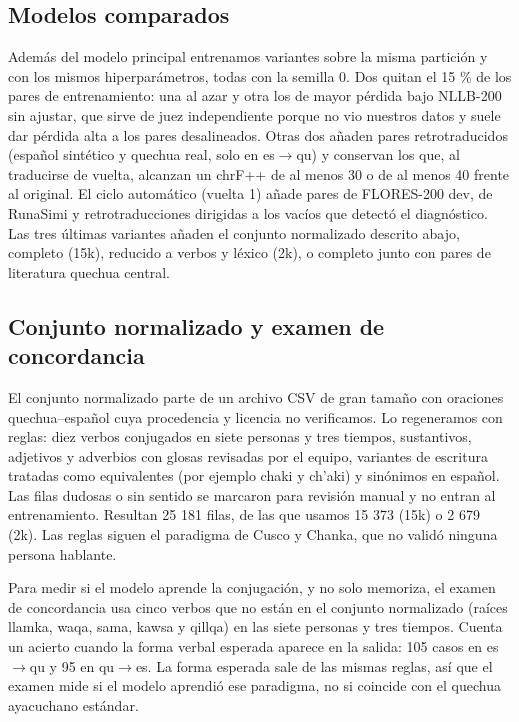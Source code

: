 \documentclass[conference]{IEEEtran}
\begin{document}
\subsection{Modelos comparados}
Además del modelo principal entrenamos variantes sobre la misma partición y con los mismos hiperparámetros, todas con la semilla 0. Dos quitan el 15 \% de los pares de entrenamiento: una al azar y otra los de mayor pérdida bajo NLLB-200 sin ajustar, que sirve de juez independiente porque no vio nuestros datos y suele dar pérdida alta a los pares desalineados. Otras dos añaden pares retrotraducidos (español sintético y quechua real, solo en es$\rightarrow$qu) y conservan los que, al traducirse de vuelta, alcanzan un chrF++ de al menos 30 o de al menos 40 frente al original. El ciclo automático (vuelta 1) añade pares de FLORES-200 dev, de RunaSimi y retrotraducciones dirigidas a los vacíos que detectó el diagnóstico. Las tres últimas variantes añaden el conjunto normalizado descrito abajo, completo (15k), reducido a verbos y léxico (2k), o completo junto con pares de literatura quechua central.

\subsection{Conjunto normalizado y examen de concordancia}
El conjunto normalizado parte de un archivo CSV de gran tamaño con oraciones quechua–español cuya procedencia y licencia no verificamos. Lo regeneramos con reglas: diez verbos conjugados en siete personas y tres tiempos, sustantivos, adjetivos y adverbios con glosas revisadas por el equipo, variantes de escritura tratadas como equivalentes (por ejemplo chaki y ch'aki) y sinónimos en español. Las filas dudosas o sin sentido se marcaron para revisión manual y no entran al entrenamiento. Resultan 25 181 filas, de las que usamos 15 373 (15k) o 2 679 (2k). Las reglas siguen el paradigma de Cusco y Chanka, que no validó ninguna persona hablante.

Para medir si el modelo aprende la conjugación, y no solo memoriza, el examen de concordancia usa cinco verbos que no están en el conjunto normalizado (raíces llamka, waqa, sama, kawsa y qillqa) en las siete personas y tres tiempos. Cuenta un acierto cuando la forma verbal esperada aparece en la salida: 105 casos en es$\rightarrow$qu y 95 en qu$\rightarrow$es. La forma esperada sale de las mismas reglas, así que el examen mide si el modelo aprendió ese paradigma, no si coincide con el quechua ayacuchano estándar.
\end{document}
